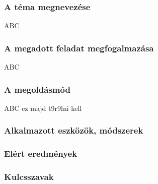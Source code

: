 \documentclass[12pt]{report}
\theoremstyle{definition}
\newcommand{\inenglish}[1]{\textsl{#1}}
\begin{document}

    \subsubsection*{A téma megnevezése}

ABC

    \subsubsection*{A megadott feladat megfogalmazása}

ABC

    \subsubsection*{A megoldásmód}

ABC ez majd t9r9lni kell \cite{Herczeg:2014:GL2D}

    \subsubsection*{Alkalmazott eszközök, módszerek}


    \subsubsection*{Elért eredmények}


    \subsubsection*{Kulcsszavak}

\end{document}
